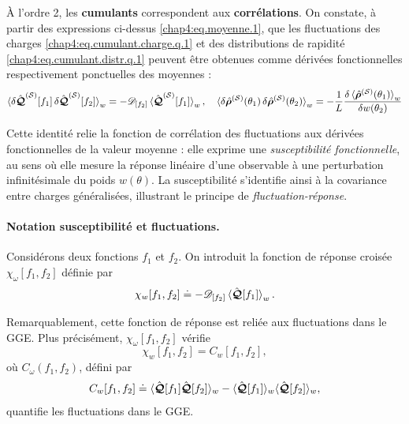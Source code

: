 À l’ordre 2, les {\bf cumulants}  correspondent aux {\bf corrélations}. On constate, à partir des expressions ci-dessus \eqref{chap4:eq.moyenne.1}, que les fluctuations des charges \eqref{chap4:eq.cumulant.charge.q.1} et des distributions de rapidité \eqref{chap4:eq.cumulant.distr.q.1} peuvent être obtenues comme dérivées fonctionnelles respectivement ponctuelles des moyennes :
\begin{eqnarray}\label{chap4:eq.susceptibilite-fonctionnelle}
	\braket{\delta\hat{\bm{\mathcal{Q}}}^{(\mathcal{S})}[f_1] \, \delta \hat{\bm{\mathcal{Q}}}^{(\mathcal{S})}[f_2]}_w   =  - \mathscr{D}_{[f_2]}  \braket{\hat{\bm{\mathcal{Q}}}^{(\mathcal{S})}[f_1]}_w, \quad \braket{\delta\hat{\bm{\rho}}^{(\mathcal{S})}(\theta_1)\, \delta\hat{\bm{\rho}}^{(\mathcal{S})}(\theta_2)}_w   =  - \frac{1}{L} \frac{\delta  \braket{\hat{\bm{\rho}}^{(\mathcal{S})}(\theta_1)}_w }{\delta w(\theta_2)}	
\end{eqnarray}

Cette identité relie la fonction de corrélation des fluctuations aux dérivées fonctionnelles de la valeur moyenne : elle exprime une \emph{susceptibilité fonctionnelle}, au sens où elle mesure la réponse linéaire d'une observable à une perturbation infinitésimale du poids $w(\theta)$. La susceptibilité s'identifie ainsi à la covariance entre charges généralisées, illustrant le principe de \emph{fluctuation-réponse}.


\paragraph{Notation susceptibilité et fluctuations.}

Considérons deux fonctions $f_1$ et $f_2$. On introduit la fonction de réponse croisée $\chi_\omega[f_1, f_2]$ définie par
\begin{equation}\label{chap4:eq.susceptibilite-fonctionnelle_2}
	\chi_w[f_1, f_2] \doteq - \mathscr{D}_{[f_2]}  \braket{\hat{\bm{\mathcal{Q}}}[f_1]}_w.
\end{equation}

Remarquablement, cette fonction de réponse est reliée aux fluctuations dans le GGE. Plus précisément, $\chi_\omega[f_1, f_2]$ vérifie
\begin{equation}\label{chap4:eq.suscep.corre.1}
	\chi_w[f_1, f_2] = C_w[f_1, f_2],
\end{equation}
où $C_\omega(f_1, f_2)$, défini par
\begin{equation}\label{chap4:eq.corre.1}
C_w[f_1, f_2] \doteq \langle \hat{\bm{\mathcal{Q}}}[f_1] \hat{\bm{\mathcal{Q}}}[f_2] \rangle_w - \langle \hat{\bm{\mathcal{Q}}}[f_1] \rangle_w \langle \hat{\bm{\mathcal{Q}}}[f_2] \rangle_w,
\end{equation}
quantifie les fluctuations dans le GGE.

